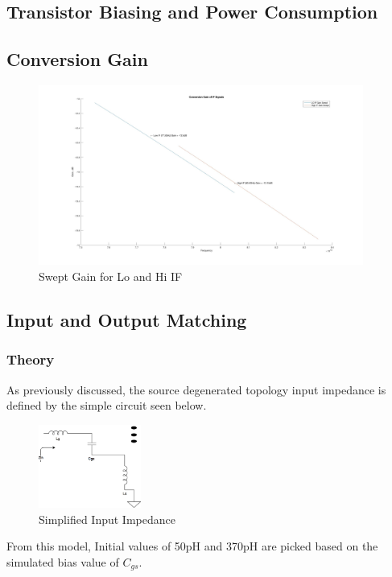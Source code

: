 \documentclass{article}                                                         %
\begin{document}
\subsection{Transistor Biasing and Power Consumption}

\subsection{Conversion Gain}
\begin{figure}[H]
  \centering
  \includegraphics[width=0.95\textwidth] {Plots/Gain.jpg}
  \caption{Swept Gain for Lo and Hi IF}
    \label{fig:matgain}
\end{figure}
\subsection{Input and Output Matching}
\subsubsection{Theory}
As previously discussed, the source degenerated topology input impedance is defined by the
simple circuit seen below.

\begin{figure}[H]
  \centering
  \includegraphics[width=0.3\textwidth] {Figures/zin}
  \caption{Simplified Input Impedance}
    \label{fig:zinSimple}
\end{figure}

From this model, Initial values of 50pH and 370pH are picked based on the simulated bias value of
$C_{gs}$.
\end{document}
